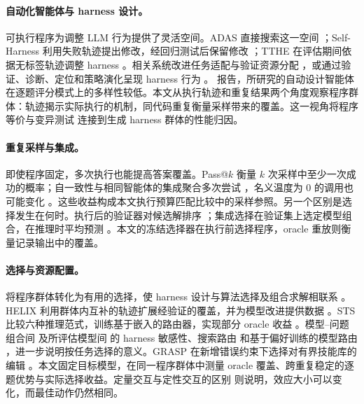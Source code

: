\paragraph{自动化智能体与 harness 设计。}
可执行程序为调整 LLM 行为提供了灵活空间。ADAS 直接搜索这一空间 \citep{adas2024}；Self-Harness 利用失败轨迹提出修改，经回归测试后保留修改 \citep{selfharness2026}；TTHE 在评估期间依据无标签轨迹调整 harness \citep{tthe2026}。相关系统改进任务适配与验证资源分配 \citep{jitagent2026,coevolve2026}，或通过验证、诊断、定位和策略演化呈现 harness 行为 \citep{harnesslens2026,harnessfix2026,ahe2026,gatedqd2026,handbook2026,harnessforge2026}。\citet{metaagents2025} 报告，所研究的自动设计智能体在逐题评分模式上的多样性较低。本文从执行轨迹和重复结果两个角度观察程序群体：轨迹揭示实际执行的机制，同代码重复衡量采样带来的覆盖。这一视角将程序等价与变异测试 \citep{budd1982,papadakis2019} 连接到生成 harness 群体的性能归因。

\paragraph{重复采样与集成。}
即使程序固定，多次执行也能提高答案覆盖。Pass@$k$ 衡量 $k$ 次采样中至少一次成功的概率；自一致性与相同智能体的集成聚合多次尝试 \citep{chen2021codex,selfconsistency2022,moreagents2024}，名义温度为 $0$ 的调用也可能变化 \citep{nondeterminism2023}。这些收益构成本文执行预算匹配比较中的采样参照。另一个区别是选择发生在何时。执行后的验证器对候选解排序 \citep{llmverifier2026}；集成选择在验证集上选定模型组合，在推理时平均预测 \citep{caruana2004}。本文的冻结选择器在执行前选择程序，oracle 重放则衡量记录输出中的覆盖。

\paragraph{选择与资源配置。}
将程序群体转化为有用的选择，使 harness 设计与算法选择及组合求解相联系 \citep{rice1976,xu2008satzilla,kotthoff2016}。HELIX 利用群体内互补的轨迹扩展经验证的覆盖，并为模型改进提供数据 \citep{helix2026}。STS 比较六种推理范式，训练基于嵌入的路由器，实现部分 oracle 收益 \citep{sts2026}。模型--问题组合间 \citep{nouniversal2026} 及所评估模型间 \citep{nonmonotone2026} 的 harness 敏感性、搜索路由 \citep{cfrouting2026} 和基于偏好训练的模型路由 \citep{routellm2024}，进一步说明按任务选择的意义。GRASP 在新增错误约束下选择对有界技能库的编辑 \citep{grasp2026}。本文固定目标模型，在同一程序群体中测量 oracle 覆盖、跨重复稳定的逐题优势与实际选择收益。定量交互与定性交互的区别 \citep{gailsimon1985} 则说明，效应大小可以变化，而最佳动作仍然相同。
